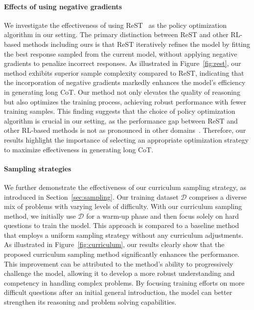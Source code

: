 \documentclass{article}
\newcommand{\citep}[1]{\parencite{#1}}
\begin{document}
\paragraph{Effects of using negative gradients} 
We investigate the effectiveness of using ReST~\citep{gulcehre2023reinforced} as the policy optimization algorithm in our setting. 
The primary distinction between  ReST and other RL-based methods including ours is that ReST iteratively refines the model by fitting the best response sampled from the current model, without applying negative gradients to penalize incorrect responses. 
As illustrated in Figure~\ref{fig:rest}, our method exhibits superior sample complexity compared to ReST, indicating that the incorporation of negative gradients markedly enhances the model's efficiency in generating long CoT. Our method not only elevates the quality of reasoning but also optimizes the training process, achieving robust performance with fewer training samples. 
This finding suggests that the choice of policy optimization algorithm is crucial in our setting, as the performance gap between ReST and other RL-based methods is not as pronounced in other domains~\citep{gulcehre2023reinforced}. Therefore, our results highlight the importance of selecting an appropriate optimization strategy to maximize effectiveness in generating long CoT.

\paragraph{Sampling strategies}

We further demonstrate the effectiveness of our curriculum sampling strategy, as introduced in Section~\ref{sec:sampling}. Our training dataset $\mathcal{D}$ comprises a diverse mix of problems with varying levels of difficulty. 
With our curriculum sampling method, we initially use $\mathcal{D}$ for a warm-up phase and then focus solely on hard questions to train the model. 
This approach is compared to a baseline method that employs a uniform sampling strategy without any curriculum adjustments. As illustrated in Figure~\ref{fig:curriculum}, our results clearly show that the proposed curriculum sampling method significantly enhances the performance. 
This improvement can be attributed to the method's ability to progressively challenge the model, allowing it to develop a more robust understanding and competency in handling complex problems. By focusing training efforts on more difficult questions after an initial general introduction, the model can better strengthen its reasoning and problem solving capabilities.  
\end{document}
